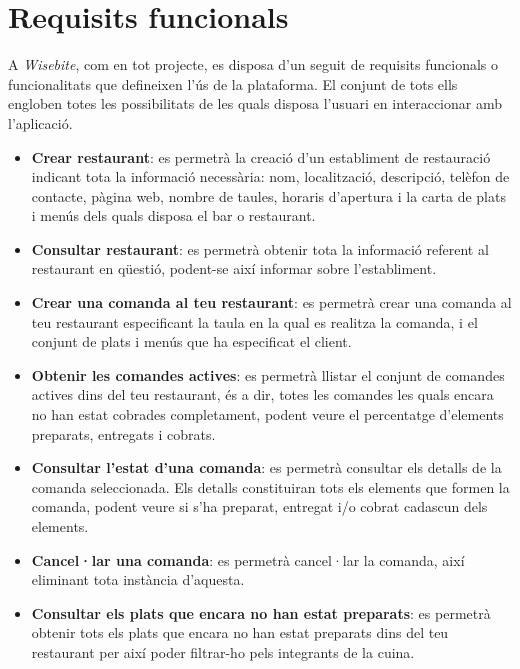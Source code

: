 
\section{Requisits funcionals}

A \textit{Wisebite}, com en tot projecte, es disposa d'un seguit de requisits funcionals o funcionalitats que defineixen l'ús de la plataforma. El conjunt de tots ells engloben totes les possibilitats de les quals disposa l'usuari en interaccionar amb l'aplicació.

\begin{itemize}
\item \textbf{Crear restaurant}: es permetrà la creació d'un establiment de restauració indicant tota la informació necessària: nom, localització, descripció, telèfon de contacte, pàgina web, nombre de taules, horaris d'apertura i la carta de plats i menús dels quals disposa el bar o restaurant.
\item \textbf{Consultar restaurant}: es permetrà obtenir tota la informació referent al restaurant en qüestió, podent-se així informar sobre l'establiment.
\item \textbf{Crear una comanda al teu restaurant}: es permetrà crear una comanda al teu restaurant especificant la taula en la qual es realitza la comanda, i el conjunt de plats i menús que ha especificat el client.
\item \textbf{Obtenir les comandes actives}: es permetrà llistar el conjunt de comandes actives dins del teu restaurant, és a dir, totes les comandes les quals encara no han estat cobrades completament, podent veure el percentatge d'elements preparats, entregats i cobrats.
\item \textbf{Consultar l'estat d'una comanda}: es permetrà consultar els detalls de la comanda seleccionada. Els detalls constituiran tots els elements que formen la comanda, podent veure si s'ha preparat, entregat i/o cobrat cadascun dels elements.
\item \textbf{Cancel·lar una comanda}: es permetrà cancel·lar la comanda, així eliminant tota instància d'aquesta.
\item \textbf{Consultar els plats que encara no han estat preparats}: es permetrà obtenir tots els plats que encara no han estat preparats dins del teu restaurant per així poder filtrar-ho pels integrants de la cuina.

\end{itemize}
